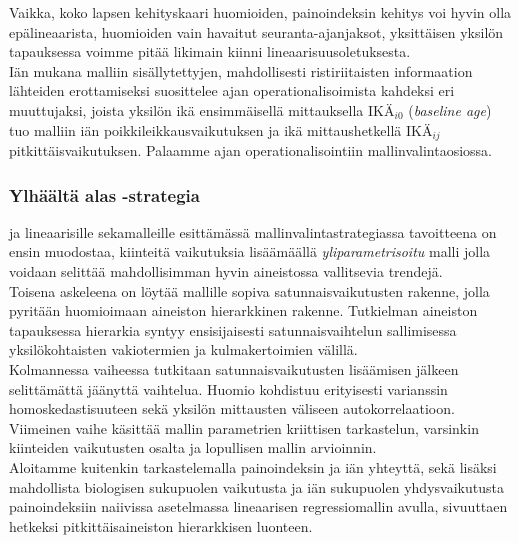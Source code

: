 \documentclass[finnish]{docopts}
\begin{document}
Vaikka, koko lapsen kehityskaari huomioiden, painoindeksin kehitys voi hyvin olla epälineaarista, huomioiden vain havaitut seuranta-ajanjaksot, yksittäisen yksilön tapauksessa voimme pitää likimain kiinni lineaarisuusoletuksesta.\\

Iän mukana malliin sisällytettyjen, mahdollisesti ristiriitaisten informaation lähteiden erottamiseksi \cite{fitzmaurice11} suosittelee ajan operationalisoimista kahdeksi eri muuttujaksi, joista yksilön ikä ensimmäisellä mittauksella $\text{IKÄ}_{i0}$ (\textit{baseline age}) tuo malliin iän poikkileikkausvaikutuksen ja ikä mittaushetkellä $\text{IKÄ}_{ij}$ pitkittäisvaikutuksen. Palaamme ajan operationalisointiin mallinvalintaosiossa.\\

\subsubsection{Ylhäältä alas -strategia}
\label{ssb:ylhalas}

\cite{west14} ja \cite{verbeke00} lineaarisille sekamalleille esittämässä mallinvalintastrategiassa tavoitteena on ensin muodostaa, kiinteitä vaikutuksia lisäämäällä \textit{yliparametrisoitu} malli jolla voidaan selittää mahdollisimman hyvin aineistossa vallitsevia trendejä.\\

Toisena askeleena on löytää mallille sopiva satunnaisvaikutusten rakenne, jolla pyritään huomioimaan aineiston hierarkkinen rakenne. Tutkielman aineiston tapauksessa hierarkia syntyy ensisijaisesti satunnaisvaihtelun sallimisessa yksilökohtaisten vakiotermien ja kulmakertoimien välillä.\\

Kolmannessa vaiheessa tutkitaan satunnaisvaikutusten lisäämisen jälkeen selittämättä jäänyttä vaihtelua. Huomio kohdistuu erityisesti varianssin homoskedastisuuteen sekä yksilön mittausten väliseen autokorrelaatioon.\\ 
Viimeinen vaihe käsittää mallin parametrien kriittisen tarkastelun, varsinkin kiinteiden vaikutusten osalta ja lopullisen mallin arvioinnin.\\

Aloitamme kuitenkin tarkastelemalla painoindeksin ja iän yhteyttä, sekä lisäksi mahdollista biologisen sukupuolen vaikutusta ja iän sukupuolen yhdysvaikutusta painoindeksiin naiivissa asetelmassa lineaarisen regressiomallin avulla, sivuuttaen hetkeksi pitkittäisaineiston hierarkkisen luonteen.\\
\end{document}
